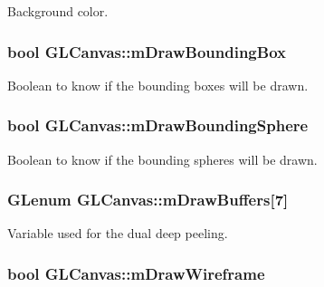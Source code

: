Background color. 

\hypertarget{class_g_l_canvas_a29134dbb47d2929ec22466af3ff82fc6}{
\subsubsection[{m\+Draw\+Bounding\+Box}]{\setlength{\rightskip}{0pt plus 5cm}bool G\+L\+Canvas\+::m\+Draw\+Bounding\+Box\hspace{0.3cm}{\ttfamily [private]}}}\label{class_g_l_canvas_a29134dbb47d2929ec22466af3ff82fc6}


Boolean to know if the bounding boxes will be drawn. 

\hypertarget{class_g_l_canvas_a8c5d1ccfff6a1d1d3d578b1f20414292}{
\subsubsection[{m\+Draw\+Bounding\+Sphere}]{\setlength{\rightskip}{0pt plus 5cm}bool G\+L\+Canvas\+::m\+Draw\+Bounding\+Sphere\hspace{0.3cm}{\ttfamily [private]}}}\label{class_g_l_canvas_a8c5d1ccfff6a1d1d3d578b1f20414292}


Boolean to know if the bounding spheres will be drawn. 

\hypertarget{class_g_l_canvas_afa09344f1201ae2c8a16c8d093ca8856}{
\subsubsection[{m\+Draw\+Buffers}]{\setlength{\rightskip}{0pt plus 5cm}G\+Lenum G\+L\+Canvas\+::m\+Draw\+Buffers\mbox{[}7\mbox{]}\hspace{0.3cm}{\ttfamily [private]}}}\label{class_g_l_canvas_afa09344f1201ae2c8a16c8d093ca8856}


Variable used for the dual deep peeling. 

\hypertarget{class_g_l_canvas_adb8c8071a5e78417ff56355466992ca1}{
\subsubsection[{m\+Draw\+Wireframe}]{\setlength{\rightskip}{0pt plus 5cm}bool G\+L\+Canvas\+::m\+Draw\+Wireframe\hspace{0.3cm}{\ttfamily [private]}}}\label{class_g_l_canvas_adb8c8071a5e78417ff56355466992ca1}



